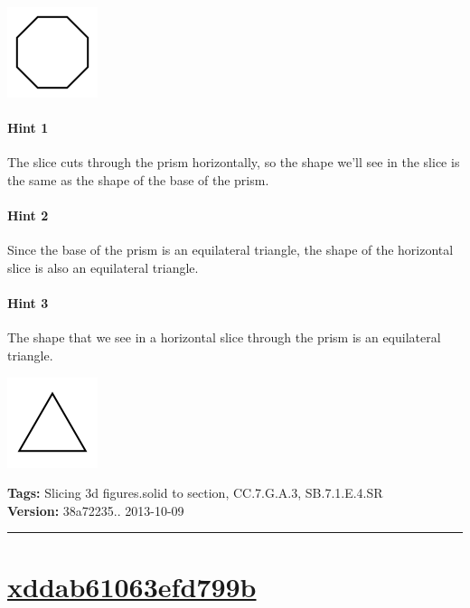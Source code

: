 \documentclass[twocolumn,10pt]{article}
\def\shrinkfactor{0.4}
\begin{document}
\includegraphics[scale=\shrinkfactor]{figures/7d98a99c75a84da8f748444ad7a3a8053be16a27.png}



\paragraph{Hint 1}The slice cuts through the prism horizontally, so the shape we'll see in the slice is the same as the shape of the base of the prism.

\paragraph{Hint 2}Since the base of the prism is an equilateral triangle, the shape of the horizontal slice is also an equilateral triangle.

\paragraph{Hint 3}The shape that we see in a horizontal slice through the prism is an equilateral triangle.   

\includegraphics[scale=\shrinkfactor]{figures/15c855a8a232e6c1873c5f46769050a9c13051b8.png}



\medskip
\noindent
\textbf{Tags:} {\footnotesize Slicing 3d figures.solid to section, CC.7.G.A.3, SB.7.1.E.4.SR}\\
\textbf{Version:} 38a72235.. 2013-10-09
\smallskip\hrule





\section{\href{https://www.khanacademy.org/devadmin/content/items/xddab61063efd799b}{xddab61063efd799b}}
\end{document}
